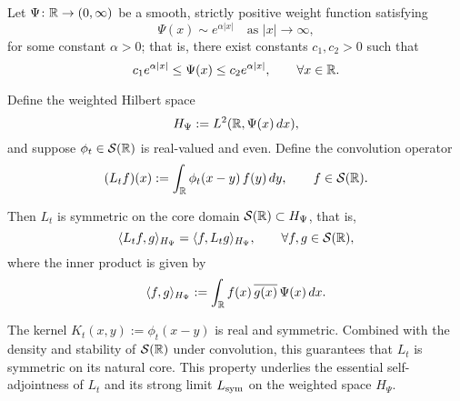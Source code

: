 \begin{proposition}
\label{prop:symmetry_Lt_Schwartz}
Let \( \Psi \colon \mathbb{R} \to (0,\infty) \) be a smooth, strictly positive weight function satisfying
\[
\Psi(x) \sim e^{\alpha|x|} \quad \text{as } |x| \to \infty,
\]
for some constant \( \alpha > 0 \); that is, there exist constants \( c_1, c_2 > 0 \) such that
\[
c_1 e^{\alpha |x|} \le \Psi(x) \le c_2 e^{\alpha |x|}, \qquad \forall x \in \mathbb{R}.
\]

Define the weighted Hilbert space
\[
H_\Psi := L^2(\mathbb{R}, \Psi(x)\, dx),
\]
and suppose \( \phi_t \in \mathcal{S}(\mathbb{R}) \) is real-valued and even. Define the convolution operator
\[
(L_t f)(x) := \int_{\mathbb{R}} \phi_t(x - y)\, f(y)\, dy, \qquad f \in \mathcal{S}(\mathbb{R}).
\]

Then \( L_t \) is symmetric on the core domain \( \mathcal{S}(\mathbb{R}) \subset H_\Psi \), that is,
\[
\langle L_t f, g \rangle_{H_\Psi} = \langle f, L_t g \rangle_{H_\Psi}, \qquad \forall f, g \in \mathcal{S}(\mathbb{R}),
\]
where the inner product is given by
\[
\langle f, g \rangle_{H_\Psi} := \int_{\mathbb{R}} f(x)\, \overline{g(x)}\, \Psi(x)\, dx.
\]

\medskip
\noindent
The kernel \( K_t(x,y) := \phi_t(x - y) \) is real and symmetric. Combined with the density and stability of \( \mathcal{S}(\mathbb{R}) \) under convolution, this guarantees that \( L_t \) is symmetric on its natural core. This property underlies the essential self-adjointness of \( L_t \) and its strong limit \( L_{\mathrm{sym}} \) on the weighted space \( H_\Psi \).
\end{proposition}
